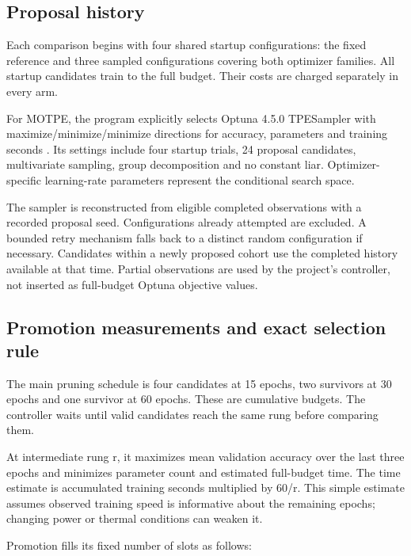 \documentclass[11pt,a4paper,oneside]{report}
\begin{document}
\subsection{Proposal history}

Each comparison begins with four shared startup configurations: the fixed reference and three sampled configurations covering both optimizer families. All startup candidates train to the full budget. Their costs are charged separately in every arm.

For MOTPE, the program explicitly selects Optuna 4.5.0 TPESampler with maximize/minimize/minimize directions for accuracy, parameters and training seconds \cite{optuna}. Its settings include four startup trials, 24 proposal candidates, multivariate sampling, group decomposition and no constant liar. Optimizer-specific learning-rate parameters represent the conditional search space.

The sampler is reconstructed from eligible completed observations with a recorded proposal seed. Configurations already attempted are excluded. A bounded retry mechanism falls back to a distinct random configuration if necessary. Candidates within a newly proposed cohort use the completed history available at that time. Partial observations are used by the project's controller, not inserted as full-budget Optuna objective values.

\subsection{Promotion measurements and exact selection rule}

The main pruning schedule is four candidates at 15 epochs, two survivors at 30 epochs and one survivor at 60 epochs. These are cumulative budgets. The controller waits until valid candidates reach the same rung before comparing them.

At intermediate rung r, it maximizes mean validation accuracy over the last three epochs and minimizes parameter count and estimated full-budget time. The time estimate is accumulated training seconds multiplied by 60/r. This simple estimate assumes observed training speed is informative about the remaining epochs; changing power or thermal conditions can weaken it.

Promotion fills its fixed number of slots as follows:
\end{document}
